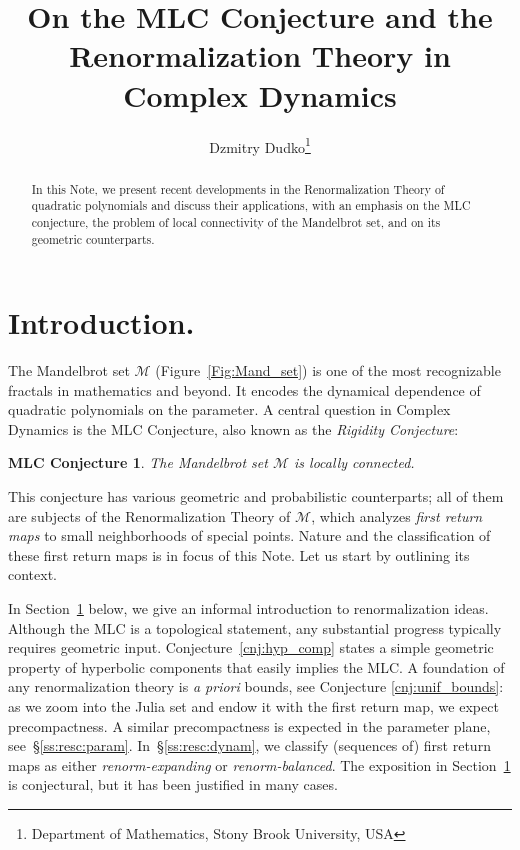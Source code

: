 \documentclass[twoside,leqno]{article}
\title{On the MLC Conjecture and the \\Renormalization Theory in Complex Dynamics}
\author{Dzmitry Dudko\thanks{Department of Mathematics, Stony Brook University, USA}}
\theoremstyle{plain}
\newtheorem{MLCconj}[thm]{MLC Conjecture}
\newcommand\MM{{\mathcal{M}}}
\begin{document}
\date{}

\maketitle


\begin{abstract}  In this Note, we present recent developments in the Renormalization Theory of quadratic polynomials and discuss their applications, with an emphasis on the MLC conjecture, the problem of local connectivity of the Mandelbrot set, and on its geometric counterparts. 
\end{abstract}

\section{Introduction.}\label{s:intro} The Mandelbrot set $\MM$ (Figure~\ref{Fig:Mand_set}) is one of the most recognizable fractals in mathematics and beyond. It encodes the dynamical dependence of quadratic polynomials on the parameter. A central question in Complex Dynamics is the MLC Conjecture, also known as the \emph{Rigidity Conjecture}:
\begin{MLCconj}
    The Mandelbrot set $\MM$ is locally connected.
\end{MLCconj}



 This conjecture has various geometric and probabilistic counterparts; all of them are subjects of the Renormalization Theory of $\MM$, which analyzes \emph{first return maps} to small neighborhoods of special points. Nature and the classification of these first return maps is in focus of this Note. Let us start by outlining its context. 



 In Section~\ref{s:intro} below, we give an informal introduction to renormalization ideas. Although the MLC is a topological statement, any substantial progress typically requires geometric input. Conjecture~\ref{cnj:hyp_comp} states a simple geometric property of hyperbolic components that easily implies the MLC. A foundation of any renormalization theory is \emph{a priori} bounds, see Conjecture \ref{cnj:unif_bounds}: as we zoom into the Julia set and endow it with the first return map, we expect precompactness. A similar precompactness is expected in the parameter plane, see~\S\ref{ss:resc:param}. In~\S\ref{ss:resc:dynam}, we classify (sequences of) first return maps as either \emph{renorm-expanding} or \emph{renorm-balanced}. The exposition in Section~\ref{s:intro} is conjectural, but it has been justified in many cases. 
\end{document}
